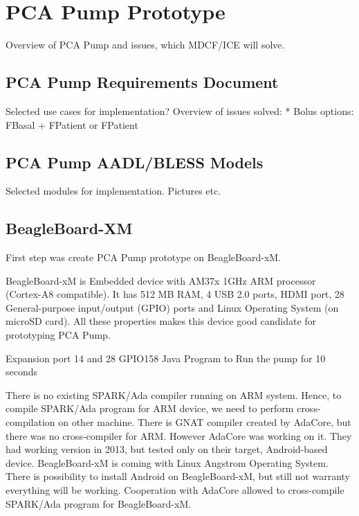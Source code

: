 
\cleardoublepage


\chapter{PCA Pump Prototype}
\label{pcapump}

Overview of PCA Pump and issues, which MDCF/ICE will solve.


\section{PCA Pump Requirements Document}
\label{pcapump:requirements-doc}
Selected use cases for implementation?
Overview of issues solved: 
* Bolus options: FBasal + FPatient or FPatient


\section{PCA Pump AADL/BLESS Models}
\label{pcapump:aadl-bless-models}
Selected modules for implementation. Pictures etc.


\section{BeagleBoard-XM}
\label{pcapump:beagleboard}
First step was create PCA Pump prototype on BeagleBoard-xM.

BeagleBoard-xM is Embedded device with AM37x 1GHz ARM processor (Cortex-A8 compatible). It has 512 MB RAM, 4 USB 2.0 ports, HDMI port, 28 General-purpose input/output (GPIO) ports and Linux Operating System (on microSD card). All these properties makes this device good candidate for prototyping PCA Pump.

Expansion port 14 and 28
GPIO158
Java Program to Run the pump for 10 seconds

There is no existing SPARK/Ada compiler running on ARM system. Hence, to compile SPARK/Ada program for ARM device, we need to perform cross-compilation on other machine. There is GNAT compiler \cite{Horn:Thesis} created by AdaCore, but there was no cross-compiler for ARM. However AdaCore was working on it. They had working version in 2013, but tested only on their target, Android-based device. BeagleBoard-xM is coming with Linux Angstrom Operating System. There is possibility to install Android on BeagleBoard-xM, but still not warranty everything will be working. Cooperation with AdaCore allowed to cross-compile SPARK/Ada program for BeagleBoard-xM.


